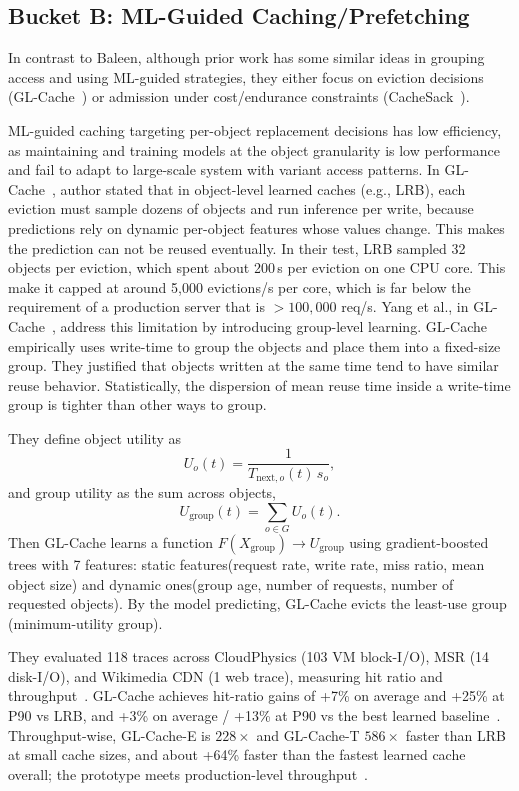 \subsection{Bucket B: ML-Guided Caching/Prefetching}\label{subsec:bucketB}

In contrast to Baleen, although prior work has some similar ideas in grouping access 
and using ML-guided strategies, they either focus on eviction decisions 
(GL-Cache~\cite{yang2023glcache}) or admission under cost/endurance constraints 
(CacheSack~\cite{yang2022cachesack}).

ML-guided caching targeting per-object replacement decisions has low efficiency, as maintaining and training models at the object granularity is low performance and fail to adapt to large-scale system with variant access patterns. In GL-Cache~\cite{yang2023glcache}, author stated that in object-level learned caches (e.g., LRB), each eviction must sample dozens of objects and run inference per write, because predictions rely on dynamic per-object features whose values change. This makes the prediction can not be reused eventually. In their test, LRB sampled 32 objects per eviction, which spent about 200\,\textmu s per eviction on one CPU core. This make it capped at around 5{,}000 evictions/s per core, which is far below the requirement of a production server that is $>100{,}000$ req/s.
Yang et al., in GL-Cache~\cite{yang2023glcache}, address this limitation by introducing group-level learning. GL-Cache~\cite{yang2023glcache} empirically uses write-time to group the objects and place them into a fixed-size group. They justified that objects written at the same time tend to have similar reuse behavior. Statistically, the dispersion of mean reuse time inside a write-time group is tighter than other ways to group.

They define object utility as
\[
U_o(t)=\frac{1}{T_{\text{next},o}(t)\,s_o},
\]
and group utility as the sum across objects,
\[
U_{\text{group}}(t)=\sum_{o\in G} U_o(t).
\]
Then GL-Cache learns a function \(F(X_{\text{group}}) \rightarrow U_{\text{group}}\) using gradient-boosted trees with 7 features: static features(request rate, write rate, miss ratio, mean object size) and dynamic ones(group age, number of requests, number of requested objects). By the model predicting, GL-Cache evicts the least-use group (minimum-utility group).

They evaluated 118 traces across CloudPhysics (103 VM block-I/O), MSR (14 disk-I/O), and Wikimedia CDN (1 web trace), measuring hit ratio and throughput~\cite{yang2023glcache}.
GL-Cache achieves hit-ratio gains of +7\% on average and +25\% at P90 vs LRB, and +3\% on average / +13\% at P90 vs the best learned baseline~\cite{yang2023glcache}.
Throughput-wise, GL-Cache-E is $228\times$ and GL-Cache-T $586\times$ faster than LRB at small cache sizes, and about +64\% faster than the fastest learned cache overall; the prototype meets production-level throughput~\cite{yang2023glcache}.

